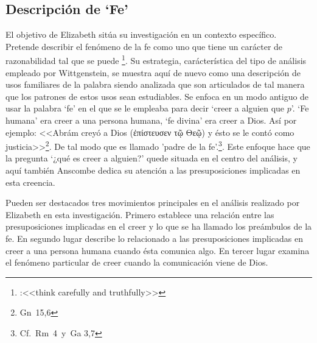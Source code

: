\subsection{Descripción de `Fe'}
El objetivo de Elizabeth sitúa su investigación en un contexto específico.
Pretende describir el fenómeno de la fe como uno que tiene un carácter de
razonabilidad tal que se puede \footnote{\cite[115]{anscombe2008faith:faith}:<<think carefully
  and truthfully>>}. Su estrategia, carácterística del tipo de análisis empleado
por Wittgenstein, se muestra aquí de nuevo como una descripción de usos
familiares de la palabra siendo analizada que son articulados de tal manera que
los patrones de estos usos sean
estudiables\autocite[Cf.~][12]{bakerhacker2009understanding}. Se enfoca en un
modo antiguo de usar la palabra `fe' en el que se le empleaba para decir `creer
a alguien que $p$'. `Fe humana' era creer a una persona humana, `fe divina' era
creer a Dios\autocite[Cf.~][2]{anscombe2008faith:tobelieve}. Así por ejemplo:
<<Abrám creyó a Dios (\textgreek{ἐπίστευσεν τῷ Θεῷ}) y ésto se le contó como
justicia>>\footnote{Gn~15,6}. De tal modo que es llamado 'padre de la
fe'.\footnote{Cf.~Rm~4~y~Ga 3,7}. Este enfoque hace que la pregunta `¿qué es
creer a alguien?' quede situada en el centro del
análisis\autocite[Cf.~][14]{anscombe2008faith:faith}, y aquí también Anscombe
dedica su atención a las presuposiciones implicadas en esta creencia.

Pueden ser destacados tres movimientos principales en el análisis realizado por
Elizabeth en esta investigación. Primero establece una relación entre las
presuposiciones implicadas en el creer y lo que se ha llamado los preámbulos de
la fe. En segundo lugar describe lo relacionado a las presuposiciones implicadas
en creer a una persona humana cuando ésta comunica algo. En tercer lugar examina
el fenómeno particular de creer cuando la comunicación viene de Dios.


